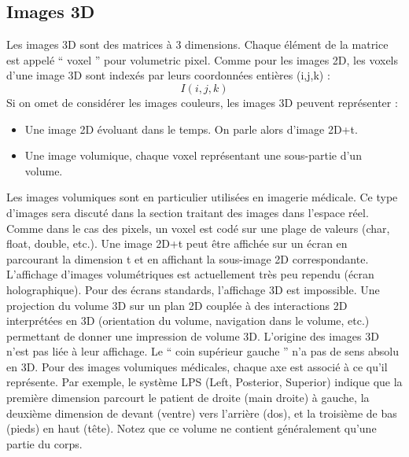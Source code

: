 \subsection{Images 3D}

Les images 3D sont des matrices à 3 dimensions. Chaque élément de la matrice est appelé `` voxel '' pour volumetric pixel. Comme pour les images 2D, les voxels d’une image 3D sont indexés par leurs coordonnées entières (i,j,k) :
$$
I(i,j,k)
$$
Si on omet de considérer les images couleurs, les images 3D peuvent représenter :
\begin{itemize}
    \item Une image 2D évoluant dans le temps. On parle alors d’image 2D+t.
    \item Une image volumique, chaque voxel représentant une sous-partie d’un volume.
\end{itemize}
Les images volumiques sont en particulier utilisées en imagerie médicale. Ce type d’images sera discuté dans la section traitant des images dans l’espace réel.
Comme dans le cas des pixels, un voxel est codé sur une plage de valeurs (char, float, double, etc.).
Une image 2D+t peut être affichée sur un écran en parcourant la dimension t et en affichant la sous-image 2D correspondante. L’affichage d’images volumétriques est actuellement très peu rependu (écran holographique). Pour des écrans standards, l’affichage 3D est impossible. Une projection du volume 3D sur un plan 2D couplée à des interactions 2D interprétées en 3D (orientation du volume, navigation dans le volume, etc.) permettant de donner une impression de volume 3D.
L’origine des images 3D n’est pas liée à leur affichage. Le `` coin supérieur gauche '' n’a pas de sens absolu en 3D. Pour des images volumiques médicales, chaque axe est associé à ce qu’il représente. Par exemple, le système LPS (Left, Posterior, Superior) indique que la première dimension parcourt le patient de droite (main droite) à gauche, la deuxième dimension de devant (ventre) vers l’arrière (dos), et la troisième de bas (pieds) en haut (tête). Notez que ce volume ne contient généralement qu’une partie du corps.